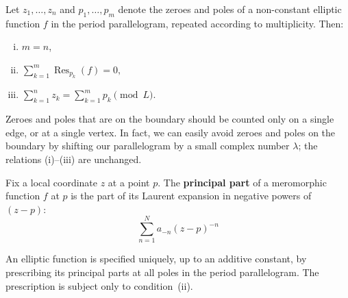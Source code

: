 \documentclass[12pt]{article}
\begin{document}
\begin{theorem}
Let $z_1, \dots, z_n$ and $p_1, \dots, p_m$ denote the zeroes and poles of a non-constant elliptic function $f$ in the period parallelogram, repeated according to multiplicity. Then:
\begin{enumerate}[(i)]
    \item $m = n$,
    \item $\displaystyle \sum_{k=1}^m \operatorname{Res}_{p_k}(f) = 0,$
    \item $\displaystyle \sum_{k=1}^n z_k = \sum_{k=1}^m p_k \pmod{L}.$
\end{enumerate}
\end{theorem}

\begin{remark}
Zeroes and poles that are on the boundary should be counted only on a single edge, or at a single vertex. 
In fact, we can easily avoid zeroes and poles on the boundary by shifting our parallelogram by a small complex number $\lambda$; 
the relations (i)--(iii) are unchanged.
\end{remark}

\begin{definition}
    Fix a local coordinate $z$ at a point $p$. The \textbf{principal part} of a meromorphic function $f$ at $p$ is the part of its Laurent expansion in negative powers of $(z-p)$:
\[\sum_{n=1}^N a_{-n}(z-p)^{-n}\]
\end{definition}


\begin{theorem}
An elliptic function is specified uniquely, up to an additive constant, 
by prescribing its principal parts at all poles in the period parallelogram. 
The prescription is subject only to condition~(ii).
\end{theorem}
\end{document}
